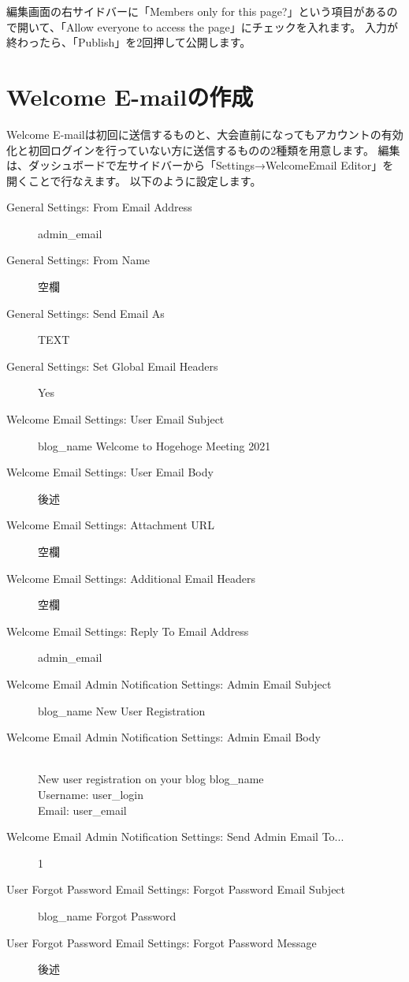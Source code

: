 \documentclass[titlepage,10pt,a4paper,uplatex]{jsbook}
\begin{document}
編集画面の右サイドバーに「Members only for this page?」という項目があるので開いて、「Allow everyone to access the page」にチェックを入れます。
入力が終わったら、「Publish」を2回押して公開します。

\section{Welcome E-mailの作成}

Welcome E-mailは初回に送信するものと、大会直前になってもアカウントの有効化と初回ログインを行っていない方に送信するものの2種類を用意します。
編集は、ダッシュボードで左サイドバーから「Settings→WelcomeEmail Editor」を開くことで行なえます。
以下のように設定します。

\begin{description}
\item[General Settings: From Email Address] {\lbrack}admin\_email{\rbrack}
\item[General Settings: From Name] 空欄
\item[General Settings: Send Email As] TEXT
\item[General Settings: Set Global Email Headers] Yes
\item[Welcome Email Settings: User Email Subject] {\lbrack}{\lbrack}blog\_name{\rbrack}{\rbrack} Welcome to Hogehoge Meeting 2021
\item[Welcome Email Settings: User Email Body] 後述
\item[Welcome Email Settings: Attachment URL] 空欄
\item[Welcome Email Settings: Additional Email Headers] 空欄
\item[Welcome Email Settings: Reply To Email Address] {\lbrack}admin\_email{\rbrack}
\item[Welcome Email Admin Notification Settings: Admin Email Subject] {\lbrack}{\lbrack}blog\_name{\rbrack}{\rbrack} New User Registration
\item[Welcome Email Admin Notification Settings: Admin Email Body] \mbox{}\vspace{-2pt}\\
New user registration on your blog {\lbrack}blog\_name{\rbrack}\\
Username: {\lbrack}user\_login{\rbrack}\\
Email: {\lbrack}user\_email{\rbrack}
\item[Welcome Email Admin Notification Settings: Send Admin Email To...] 1
\item[User Forgot Password Email Settings: Forgot Password Email Subject] {\lbrack}{\lbrack}blog\_name{\rbrack}{\rbrack} Forgot Password
\item[User Forgot Password Email Settings: Forgot Password Message] 後述
\end{description}
\end{document}
